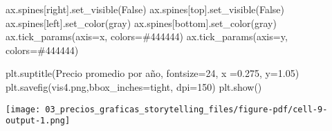 \documentclass[
  letterpaper,
  DIV=11,
  numbers=noendperiod]{scrreprt}
\newenvironment{Shaded}{\begin{snugshade}}{\end{snugshade}}
\newcommand{\DecValTok}[1]{\textcolor[rgb]{0.68,0.00,0.00}{#1}}
\newcommand{\FloatTok}[1]{\textcolor[rgb]{0.68,0.00,0.00}{#1}}
\newcommand{\NormalTok}[1]{\textcolor[rgb]{0.00,0.23,0.31}{#1}}
\newcommand{\OperatorTok}[1]{\textcolor[rgb]{0.37,0.37,0.37}{#1}}
\newcommand{\StringTok}[1]{\textcolor[rgb]{0.13,0.47,0.30}{#1}}
\newcommand{\VariableTok}[1]{\textcolor[rgb]{0.07,0.07,0.07}{#1}}
\begin{document}
\begin{Shaded}
\begin{Highlighting}[]
\NormalTok{ax.spines[}\StringTok{\textquotesingle{}right\textquotesingle{}}\NormalTok{].set\_visible(}\VariableTok{False}\NormalTok{)}
\NormalTok{ax.spines[}\StringTok{\textquotesingle{}top\textquotesingle{}}\NormalTok{].set\_visible(}\VariableTok{False}\NormalTok{)}
\NormalTok{ax.spines[}\StringTok{\textquotesingle{}left\textquotesingle{}}\NormalTok{].set\_color(}\StringTok{\textquotesingle{}gray\textquotesingle{}}\NormalTok{)}
\NormalTok{ax.spines[}\StringTok{\textquotesingle{}bottom\textquotesingle{}}\NormalTok{].set\_color(}\StringTok{\textquotesingle{}gray\textquotesingle{}}\NormalTok{)}
\NormalTok{ax.tick\_params(axis}\OperatorTok{=}\StringTok{\textquotesingle{}x\textquotesingle{}}\NormalTok{, colors}\OperatorTok{=}\StringTok{\textquotesingle{}\#444444\textquotesingle{}}\NormalTok{)}
\NormalTok{ax.tick\_params(axis}\OperatorTok{=}\StringTok{\textquotesingle{}y\textquotesingle{}}\NormalTok{, colors}\OperatorTok{=}\StringTok{\textquotesingle{}\#444444\textquotesingle{}}\NormalTok{)}

\NormalTok{plt.suptitle(}\StringTok{\textquotesingle{}Precio promedio por año\textquotesingle{}}\NormalTok{, fontsize}\OperatorTok{=}\DecValTok{24}\NormalTok{, x }\OperatorTok{=}\FloatTok{0.275}\NormalTok{, y}\OperatorTok{=}\FloatTok{1.05}\NormalTok{)}
\NormalTok{plt.savefig(}\StringTok{\textquotesingle{}vis4.png\textquotesingle{}}\NormalTok{,bbox\_inches}\OperatorTok{=}\StringTok{\textquotesingle{}tight\textquotesingle{}}\NormalTok{, dpi}\OperatorTok{=}\DecValTok{150}\NormalTok{)}
\NormalTok{plt.show()}
\end{Highlighting}
\end{Shaded}

\texttt{[image: 03\_precios\_graficas\_storytelling\_files/figure-pdf/cell-9-output-1.png]}
\end{document}
